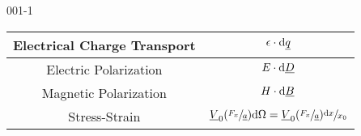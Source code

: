 \begin{mitframe}{001-1}
{\begin{tabular}{ | c | c |  }
	\hline  
            
	Electrical Charge Transport & $\elecpot \cdot \mathrm{d}\eleccharge$ \\
            
	\hline  
    
            
	Electric Polarization & $\elecfield \cdot \mathrm{d}\uline{\elecdisplace}$ \\
            
	\hline
            
	Magnetic Polarization & $\magfield \cdot \mathrm{d}\magind$ \\ \hline
            
	Stress-Strain & $\origvol(\sfrac{\force_{\disp}}{\totalsa})\mathrm{d}\linstrain = \origvol(\sfrac{\force_{\disp}}{\totalsa})\sfrac{\mathrm{d}\disp}{\disp_{\init}} $ \\ 
%
%
    
    \hline  
    
    
            
\end{tabular}

}
\end{mitframe}